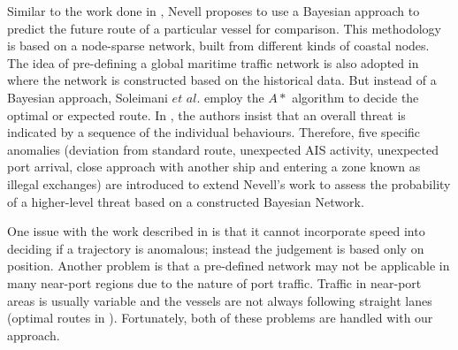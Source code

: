 \documentclass[12pt,glossary]{dalcsthesis}
\begin{document}
Similar to the work done in \cite{PallottaFramework}, Nevell \cite{bn_White} proposes to use a Bayesian approach to predict the future route of a particular vessel for comparison. This methodology is based on a node-sparse network, built from different kinds of coastal nodes. The idea of pre-defining a global maritime traffic network is also adopted in \cite{Soleimani} where the network is constructed based on the historical data. But instead of a Bayesian approach, Soleimani $et$ $al.$ \cite{Soleimani} employ the $A*$ \cite{astar} algorithm to decide the optimal or expected route.
In \cite{bn_Richard}, the authors insist that an overall threat is indicated by a sequence of the individual behaviours. Therefore, five specific anomalies (deviation from standard route, unexpected AIS activity, unexpected port arrival, close approach with another ship and entering a zone known as illegal exchanges) are introduced to extend Nevell's work \cite{bn_White} to assess the probability of a higher-level threat based on a constructed Bayesian Network.

One issue with the work described in \cite{bn_White}\cite{bn_Richard} is that it cannot incorporate speed into deciding if a trajectory is anomalous; instead the judgement is based only on position. Another problem is that a pre-defined network may not be applicable in many near-port regions due to the nature of port traffic. Traffic in near-port areas is usually  variable and the vessels are not always following straight lanes (optimal routes in \cite{bn_White}\cite{bn_Richard}). Fortunately, both of these problems are handled with our approach.


\end{document}
